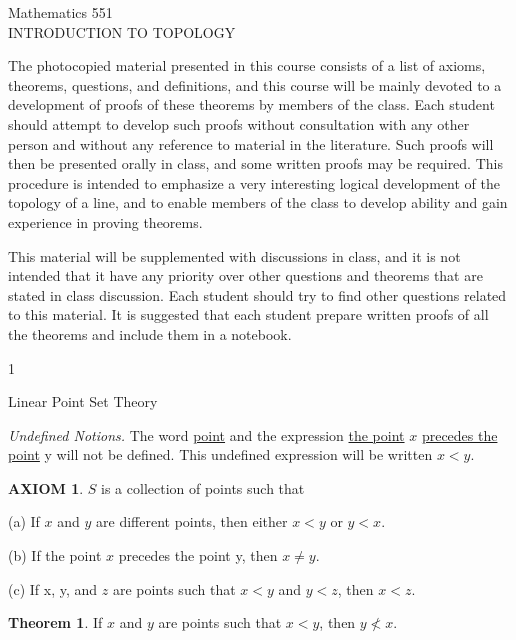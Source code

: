\documentclass[12pt, oneside, letter] {amsart}
\theoremstyle {definition}
\newtheorem {thm} {Theorem}
\newtheorem {ax} {AXIOM}
\theoremstyle {remark}
\begin{document}
\pagestyle {plain}
\begin{center}
  Mathematics 551\\
  INTRODUCTION TO TOPOLOGY
\end{center}


The photocopied material presented in this course consists of a list
of axioms, theorems, questions, and definitions, and this course will
be mainly devoted to a development of proofs of these theorems by
members of the class. Each student should attempt to develop such
proofs without consultation with any other person and without any
reference to material in the literature. Such proofs will then be
presented orally in class, and some written proofs may be required.
This procedure is intended to emphasize a very interesting logical
development of the topology of a line, and to enable members of the
class to develop ability and gain experience in proving theorems.

This material will be supplemented with discussions in class, and it
is not intended that it have any priority over other questions and
theorems that are stated in class discussion. Each student should try
to find other questions related to this material.  It is suggested
that each student prepare written proofs of all the theorems and
include them in a notebook.

\vfill\eject \setcounter {page} {1}
\begin{center}
  Linear Point Set Theory
\end{center}

\bigskip

\noindent \textit {Undefined Notions.} The word \underline {point} and
the expression \underline {the point} $x$ \underline {precedes the
  point} y will not be defined. This undefined expression will be
written $x < y$.

\begin{ax}
  $S$ is a collection of points such that
  
  (a) If $x$ and $y$ are different points, then either $x < y$ or $y <
  x$.
  
  (b) If the point $x$ precedes the point y, then $x \neq y$.
  
  (c) If x, y, and $z$ are points such that $x < y$ and $y < z$, then
  $x < z$.
\end{ax}

\begin{thm}
  If $x$ and $y$ are points such that $x < y$, then $y \not< x$.
\end{thm}
\end{document}
